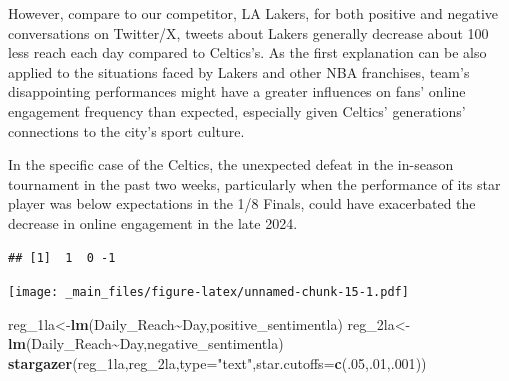 \documentclass[
]{book}
\newenvironment{Shaded}{\begin{snugshade}}{\end{snugshade}}
\newcommand{\AttributeTok}[1]{\textcolor[rgb]{0.13,0.29,0.53}{#1}}
\newcommand{\DecValTok}[1]{\textcolor[rgb]{0.00,0.00,0.81}{#1}}
\newcommand{\FunctionTok}[1]{\textcolor[rgb]{0.13,0.29,0.53}{\textbf{#1}}}
\newcommand{\NormalTok}[1]{#1}
\newcommand{\OtherTok}[1]{\textcolor[rgb]{0.56,0.35,0.01}{#1}}
\newcommand{\SpecialCharTok}[1]{\textcolor[rgb]{0.81,0.36,0.00}{\textbf{#1}}}
\newcommand{\StringTok}[1]{\textcolor[rgb]{0.31,0.60,0.02}{#1}}
\begin{document}
However, compare to our competitor, LA Lakers, for both positive and negative conversations on Twitter/X, tweets about Lakers generally decrease about 100 less reach each day compared to Celtics's. As the first explanation can be also applied to the situations faced by Lakers and other NBA franchises, team's disappointing performances might have a greater influences on fans' online engagement frequency than expected, especially given Celtics' generations' connections to the city's sport culture.

In the specific case of the Celtics, the unexpected defeat in the in-season tournament in the past two weeks, particularly when the performance of its star player was below expectations in the 1/8 Finals, could have exacerbated the decrease in online engagement in the late 2024.

\begin{verbatim}
## [1]  1  0 -1
\end{verbatim}

\texttt{[image: \_main\_files/figure-latex/unnamed-chunk-15-1.pdf]}

\begin{Shaded}
\begin{Highlighting}[]
\NormalTok{reg\_1la}\OtherTok{\textless{}{-}}\FunctionTok{lm}\NormalTok{(Daily\_Reach}\SpecialCharTok{\textasciitilde{}}\NormalTok{Day,positive\_sentimentla)}
\NormalTok{reg\_2la}\OtherTok{\textless{}{-}}\FunctionTok{lm}\NormalTok{(Daily\_Reach}\SpecialCharTok{\textasciitilde{}}\NormalTok{Day,negative\_sentimentla)}
\FunctionTok{stargazer}\NormalTok{(reg\_1la,reg\_2la,}\AttributeTok{type=}\StringTok{"text"}\NormalTok{,}\AttributeTok{star.cutoffs=}\FunctionTok{c}\NormalTok{(.}\DecValTok{05}\NormalTok{,.}\DecValTok{01}\NormalTok{,.}\DecValTok{001}\NormalTok{))}
\end{Highlighting}
\end{Shaded}
\end{document}
